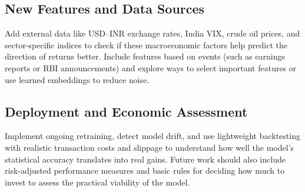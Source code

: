 \documentclass[conference]{IEEEtran}
\begin{document}
\subsection{New Features and Data Sources}

Add external data like USD--INR exchange rates, India VIX, crude oil prices, and sector-specific indices to check if these macroeconomic factors help predict the direction of returns better. Include features based on events (such as earnings reports or RBI announcements) and explore ways to select important features or use learned embeddings to reduce noise.

\subsection{Deployment and Economic Assessment}

Implement ongoing retraining, detect model drift, and use lightweight backtesting with realistic transaction costs and slippage to understand how well the model’s statistical accuracy translates into real gains. Future work should also include risk-adjusted performance measures and basic rules for deciding how much to invest to assess the practical viability of the model.
\end{document}
